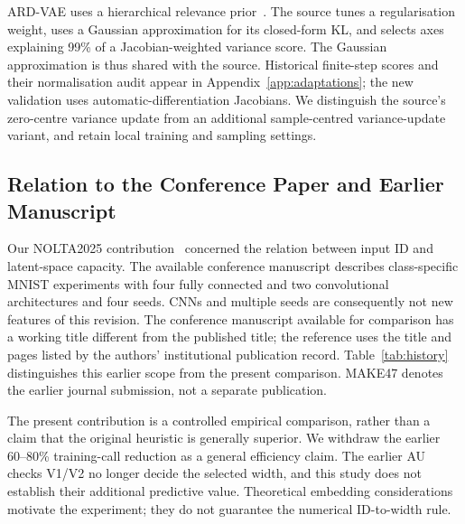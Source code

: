 \documentclass[make,article,submit,pdftex,moreauthors]{Definitions/mdpi}
\begin{document}
ARD-VAE uses a hierarchical relevance prior~\cite{saha2025ardvae}.
The source tunes a regularisation weight, uses a Gaussian approximation
for its closed-form KL, and selects axes explaining 99\% of a
Jacobian-weighted variance score. The Gaussian approximation is thus
shared with the source. Historical finite-step scores and their
normalisation audit appear in Appendix~\ref{app:adaptations}; the new
validation uses automatic-differentiation Jacobians. We distinguish the
source's zero-centre variance update from an additional sample-centred
variance-update variant, and retain local training and sampling settings.

\subsection{Relation to the Conference Paper and Earlier Manuscript}
Our NOLTA2025 contribution~\cite{obata2025manifold} concerned the relation
between input ID and latent-space capacity. The available conference
manuscript describes class-specific MNIST experiments with four fully
connected and two convolutional architectures and four seeds. CNNs and
multiple seeds are consequently not new features of this revision.
The conference manuscript available for comparison has a working title
different from the published title; the reference uses the title and
pages listed by the authors' institutional publication record.
Table~\ref{tab:history} distinguishes this earlier scope from the present
comparison. MAKE47 denotes the earlier journal submission, not a separate
publication.

The present contribution is a controlled empirical comparison, rather
than a claim that the original heuristic is generally superior.
We withdraw the earlier 60--80\% training-call reduction as a general
efficiency claim. The earlier AU checks V1/V2 no longer decide the
selected width, and this study does not establish their additional
predictive value. Theoretical embedding considerations motivate the
experiment; they do not guarantee the numerical ID-to-width rule.
\end{document}
